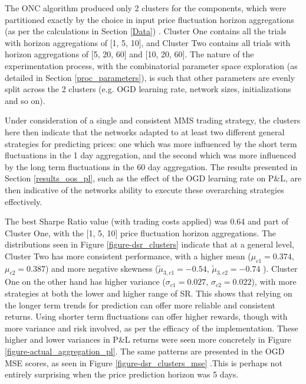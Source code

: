 \documentclass[a4paper,11pt,oneside]{article}
\theoremstyle{plain}
\theoremstyle{definition}
\begin{document}
	The ONC algorithm produced only 2 clusters for the components, which were partitioned exactly by the choice in input price fluctuation horizon aggregations (as per the calculations in Section \ref{Data}) . Cluster One contains all the trials with horizon aggregations of [1, 5, 10], and Cluster Two contains all trials with horizon aggregations of [5, 20, 60] and [10, 20, 60]. The nature of the experimentation process, with the combinatorial parameter space exploration (as detailed in Section \ref{proc_parameters}), is such that other parameters are evenly split across the 2 clusters (e.g. OGD learning rate, network sizes, initializations and so on).\newline
	
	Under consideration of a single and consistent MMS trading strategy, the clusters here then indicate that the networks adapted to at least two different general strategies for predicting prices: one which was more influenced by the short term fluctuations in the 1 day aggregation, and the second which was more influenced by the long term fluctuations in the 60 day aggregation. The results presented in Section \ref{results_oos_pl}, such as the effect of the OGD learning rate on P\&L, are then indicative of the networks ability to execute these overarching strategies effectively. \newline
	
	The best Sharpe Ratio value (with trading costs applied) was 0.64 and part of Cluster One, with the [1, 5, 10] price fluctuation horizon aggregations. The distributions seen in Figure \ref{figure-dsr_clusters} indicate that at a general level, Cluster Two has more consistent performance, with a higher mean ($\mu_{c1} = 0.374$, $\mu_{c2} = 0.387$) and more negative skewness ($\tilde{\mu}_{3,c1} = -0.54$, $\tilde{\mu}_{3,c2} = -0.74$ ). Cluster One on the other hand has higher variance ($\sigma_{c1} = 0.027$, $\sigma_{c2} = 0.022$), with more strategies at both the lower and higher range of SR. This shows that relying on the longer term trends for prediction can offer more reliable and consistent returns. Using shorter term fluctuations can offer higher rewards, though with more variance and risk involved, as per the efficacy of the implementation. These higher and lower variances in P\&L returns were seen more concretely in Figure \ref{figure-actual_aggregation_pl}. The same patterns are presented in the OGD MSE scores, as seen in Figure \ref{figure-dsr_clusters_mse} .This is perhaps not entirely surprising when the price prediction horizon was 5 days.\newline
\end{document}
